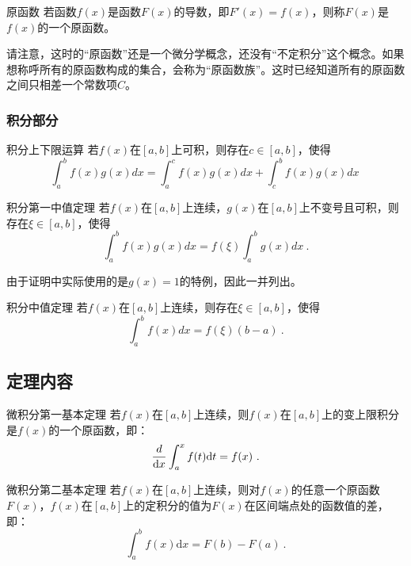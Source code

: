 \begin{definition}{原函数}\label{def_FTcalc_3}
若函数$f(x)$是函数$F(x)$的导数，即$F'(x)=f(x)$，则称$F(x)$是$f(x)$的一个原函数。
\end{definition}

请注意，这时的“原函数”还是一个微分学概念，还没有“不定积分”这个概念。如果想称呼所有的原函数构成的集合，会称为“原函数族”。这时已经知道所有的原函数之间只相差一个常数项$C$。

\subsubsection{积分部分}

\begin{lemma}{积分上下限运算}\label{lem_FTcalc_1}
若$f(x)$在$[a,b]$上可积，则存在$c\in[a,b]$，使得
$$\int_{a}^{b} f(x)g(x)dx=\int_{a}^{c} f(x)g(x)dx+\int_{c}^{b} f(x)g(x)dx~$$
\end{lemma}

\begin{lemma}{积分第一中值定理}
若$f(x)$在$[a,b]$上连续，$g(x)$在$[a,b]$上不变号且可积，则存在$\xi\in[a,b]$，使得
$$\int_{a}^{b} f(x)g(x)dx=f(\xi)\int_{a}^{b} g(x)dx~.$$
\end{lemma}

由于证明中实际使用的是$g(x)=1$的特例，因此一并列出。

\begin{lemma}{积分中值定理}\label{lem_FTcalc_2}
若$f(x)$在$[a,b]$上连续，则存在$\xi\in[a,b]$，使得
$$\int_{a}^{b} f(x)dx=f(\xi)(b-a)~.$$
\end{lemma}

\subsection{定理内容}

\begin{theorem}{微积分第一基本定理}
若$f(x)$在$[a,b]$上连续，则$f(x)$在$[a,b]$上的变上限积分是$f(x)$的一个原函数，即：
\begin{equation}
{d\over\mathrm {d}x}\int_{a}^{x}f(t)\mathrm {d}t=f(x)~.
\end{equation}
\end{theorem}

\begin{theorem}{微积分第二基本定理}
若$f(x)$在$[a,b]$上连续，则对$f(x)$的任意一个原函数$F(x)$，$f(x)$在$[a,b]$上的定积分的值为$F(x)$在区间端点处的函数值的差，即：
\begin{equation}
\int_{a}^{b} f(x)\mathrm {d}x=F(b)-F(a)~.
\end{equation}
\end{theorem}

